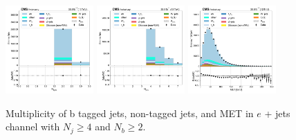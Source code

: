 \begin{figure}[htb!]
    \centering
    \includegraphics[width=0.3\textwidth]{chapters/Analysis/sectionPlots/figures/data_mc_overlays/ejet_2016_cat_gt4_gt2_signal_linear_jet_n_bjets}
    \includegraphics[width=0.3\textwidth]{chapters/Analysis/sectionPlots/figures/data_mc_overlays/ejet_2016_cat_gt4_gt2_signal_linear_jet_n_jets}
    \includegraphics[width=0.3\textwidth]{chapters/Analysis/sectionPlots/figures/data_mc_overlays/ejet_2016_cat_gt4_gt2_signal_linear_misc_met_mag}
    \caption{Multiplicity of b tagged jets, non-tagged jets, and MET in
    $e$ + jets channel with $N_{j} \geq 4$ and $N_{b} \geq 2$.
    \label{fig:analysis:plots:ejet_2_jetmet}}
\end{figure}
